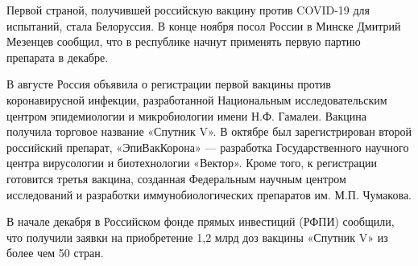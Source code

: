 Первой страной, получившей российскую вакцину против COVID-19 для испытаний,
стала Белоруссия. В конце ноября посол России в Минске Дмитрий Мезенцев
сообщил, что в республике начнут применять первую партию препарата в декабре.

В августе Россия объявила о регистрации первой вакцины против коронавирусной
инфекции, разработанной Национальным исследовательским центром эпидемиологии и
микробиологии имени Н.Ф. Гамалеи. Вакцина получила торговое название «Спутник
V». В октябре был зарегистрирован второй российский препарат, «ЭпиВакКорона» —
разработка Государственного научного центра вирусологии и биотехнологии
«Вектор». Кроме того, к регистрации готовится третья вакцина, созданная
Федеральным научным центром исследований и разработки иммунобиологических
препаратов им. М.П. Чумакова.

В начале декабря в Российском фонде прямых инвестиций (РФПИ) сообщили, что
получили заявки на приобретение 1,2 млрд доз вакцины «Спутник V» из более чем
50 стран.



